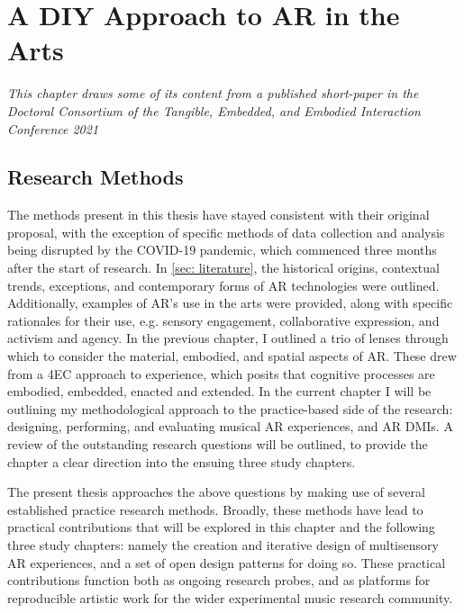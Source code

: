 \chapter{A DIY Approach to AR in the Arts}
\label{sec: method}
\epigraph{\emph{This chapter draws some of its content from a published short-paper in the Doctoral Consortium of the Tangible, Embedded, and Embodied Interaction Conference 2021}}{\cite[]{bilbow2021b}}



\section{Research Methods}\label{sec: method-methods} %
The methods present in this thesis have stayed consistent with their original proposal, with the exception of specific methods of data collection and analysis being disrupted by the COVID-19 pandemic, which commenced three months after the start of research. 
In \autoref{sec: literature}, the historical origins, contextual trends, exceptions, and contemporary forms of AR technologies were outlined. Additionally, examples of AR's use in the arts were provided, along with specific rationales for their use, e.g. sensory engagement, collaborative expression, and activism and agency. In the previous chapter, I outlined a trio of lenses through which to consider the material, embodied, and spatial aspects of AR. These drew from a 4EC approach to experience, which posits that cognitive processes are embodied, embedded, enacted and extended. In the current chapter I will be outlining my methodological approach to the practice-based side of the research: designing, performing, and evaluating musical AR experiences, and AR DMIs. A review of the outstanding research questions will be outlined, to provide the chapter a clear direction into the ensuing three study chapters.

\begin{enumerate}
    \RQmedium
    \RQexperience
    \RQfuture
\end{enumerate}

The present thesis approaches the above questions by making use of several established practice research methods. Broadly, these methods have lead to practical contributions that will be explored in this chapter and the following three study chapters: namely the creation and iterative design of multisensory AR experiences, and a set of open design patterns for doing so. These practical contributions function both as ongoing research probes, and as platforms for reproducible artistic work for the wider experimental music research community. 

